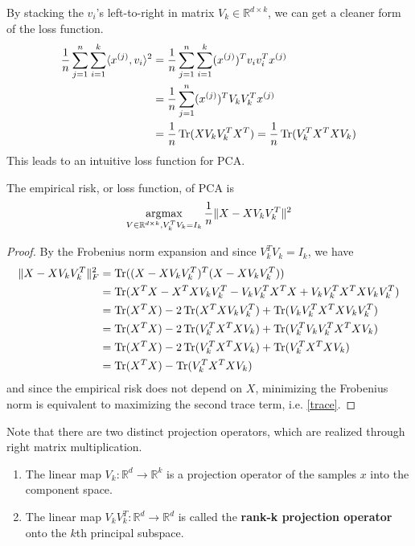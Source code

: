   By stacking the $v_i$'s left-to-right in matrix $V_k \in \mathbb{R}^{d \times k}$, we can get a cleaner form of the loss function. 
  \begin{align}
    \frac{1}{n} \sum_{j=1}^n \sum_{i=1}^k \langle x^{(j)}, v_i \rangle^2 
    & = \frac{1}{n} \sum_{j=1}^n \sum_{i=1}^k (x^{(j)})^T v_i v_i^T x^{(j)} \\ 
    & = \frac{1}{n} \sum_{j=1}^n (x^{(j)})^T V_k V_k^T x^{(j)} \\ 
    & = \frac{1}{n} \operatorname{Tr}(X V_k V_k^T X^T) = \frac{1}{n} \operatorname{Tr}(V_k^T X^T  X V_k) \label{trace}
  \end{align}
  This leads to an intuitive loss function for PCA. 

  \begin{theorem}
    The empirical risk, or loss function, of PCA is
    \begin{equation}
      \operatorname*{\arg\!\max}_{V \in \mathbb{R}^{d \times k}, V_k^T V_k = I_k} 
      \frac{1}{n} \| X - X V_k V_k^T\|^2
    \end{equation}
  \end{theorem} 
  \begin{proof}
    By the Frobenius norm expansion and since $V_k^T V_k = I_k$, we have 
    \begin{align}
      \|X - X V_k V_k^T\|_F^2 
      & = \operatorname{Tr}((X - X V_k V_k^T)^T(X - X V_k V_k^T)) \\
      & = \operatorname{Tr}(X^T X - X^T X V_k V_k^T - V_k V_k^T X^T X + V_k V_k^T X^T X V_k V_k^T) \\
      & = \operatorname{Tr}(X^T X) - 2\operatorname{Tr}(X^T X V_k V_k^T) + \operatorname{Tr}(V_k V_k^T X^T X V_k V_k^T) \\ 
      & = \operatorname{Tr}(X^T X) - 2\operatorname{Tr}(V_k^T X^T X V_k) + \operatorname{Tr}(V_k^T V_k V_k^T X^T X V_k) \\
      & = \operatorname{Tr}(X^T X) - 2\operatorname{Tr}(V_k^T X^T X V_k) + \operatorname{Tr}(V_k^T X^T X V_k) \\ 
      & = \operatorname{Tr}(X^T X) - \operatorname{Tr}(V_k^T X^T X V_k) 
    \end{align}
    and since the empirical risk does not depend on $X$, minimizing the Frobenius norm is equivalent to maximizing the second trace term, i.e. \ref{trace}. 
  \end{proof}

  \begin{definition}
    Note that there are two distinct projection operators, which are realized through right matrix multiplication. 
    \begin{enumerate}
      \item The linear map $V_k : \mathbb{R}^d \to \mathbb{R}^k$ is a projection operator of the samples $x$ into the component space. 
      \item The linear map $V_k V_k^T : \mathbb{R}^d \to \mathbb{R}^d$ is called the \textbf{rank-k projection operator} onto the $k$th principal subspace. 
    \end{enumerate}
  \end{definition}

